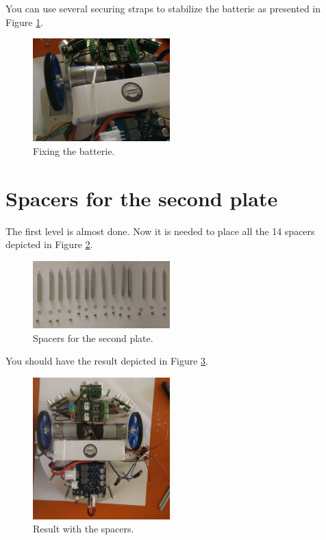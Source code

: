 \documentclass[10pt,a4paper]{report}   %
\begin{document}
 You can use several securing straps to stabilize the batterie as presented in Figure \ref{fig:47}.

\begin{figure}[H]
\center
\includegraphics[width=200px]{images/47.jpg}
\caption{Fixing the batterie.}
\label{fig:47}
\end{figure}

\section{Spacers for the second plate}

The first level is almost done. Now it is needed to place all the 14 spacers depicted in Figure \ref{fig:48}. 

\begin{figure}[H]
\center
\includegraphics[width=200px]{images/48.jpg}
\caption{Spacers for the second plate.}
\label{fig:48}
\end{figure}

You should have the result depicted in Figure \ref{fig:49}.

\begin{figure}[H]
\center
\includegraphics[width=200px]{images/49.jpg}
\caption{Result with the spacers.}
\label{fig:49}
\end{figure}
\end{document}
